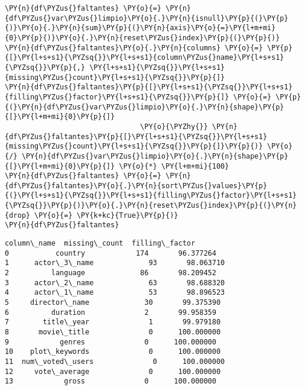     \begin{tcolorbox}[breakable, size=fbox, boxrule=1pt, pad at break*=1mm,colback=cellbackground, colframe=cellborder]
\begin{Verbatim}[commandchars=\\\{\}]
\PY{n}{df\PYZus{}faltantes} \PY{o}{=} \PY{n}{df\PYZus{}var\PYZus{}limpio}\PY{o}{.}\PY{n}{isnull}\PY{p}{(}\PY{p}{)}\PY{o}{.}\PY{n}{sum}\PY{p}{(}\PY{n}{axis}\PY{o}{=}\PY{l+m+mi}{0}\PY{p}{)}\PY{o}{.}\PY{n}{reset\PYZus{}index}\PY{p}{(}\PY{p}{)}
\PY{n}{df\PYZus{}faltantes}\PY{o}{.}\PY{n}{columns} \PY{o}{=} \PY{p}{[}\PY{l+s+s1}{\PYZsq{}}\PY{l+s+s1}{column\PYZus{}name}\PY{l+s+s1}{\PYZsq{}}\PY{p}{,} \PY{l+s+s1}{\PYZsq{}}\PY{l+s+s1}{missing\PYZus{}count}\PY{l+s+s1}{\PYZsq{}}\PY{p}{]}
\PY{n}{df\PYZus{}faltantes}\PY{p}{[}\PY{l+s+s1}{\PYZsq{}}\PY{l+s+s1}{filling\PYZus{}factor}\PY{l+s+s1}{\PYZsq{}}\PY{p}{]} \PY{o}{=} \PY{p}{(}\PY{n}{df\PYZus{}var\PYZus{}limpio}\PY{o}{.}\PY{n}{shape}\PY{p}{[}\PY{l+m+mi}{0}\PY{p}{]} 
                                \PY{o}{\PYZhy{}} \PY{n}{df\PYZus{}faltantes}\PY{p}{[}\PY{l+s+s1}{\PYZsq{}}\PY{l+s+s1}{missing\PYZus{}count}\PY{l+s+s1}{\PYZsq{}}\PY{p}{]}\PY{p}{)} \PY{o}{/} \PY{n}{df\PYZus{}var\PYZus{}limpio}\PY{o}{.}\PY{n}{shape}\PY{p}{[}\PY{l+m+mi}{0}\PY{p}{]} \PY{o}{*} \PY{l+m+mi}{100}
\PY{n}{df\PYZus{}faltantes} \PY{o}{=} \PY{n}{df\PYZus{}faltantes}\PY{o}{.}\PY{n}{sort\PYZus{}values}\PY{p}{(}\PY{l+s+s1}{\PYZsq{}}\PY{l+s+s1}{filling\PYZus{}factor}\PY{l+s+s1}{\PYZsq{}}\PY{p}{)}\PY{o}{.}\PY{n}{reset\PYZus{}index}\PY{p}{(}\PY{n}{drop} \PY{o}{=} \PY{k+kc}{True}\PY{p}{)}
\PY{n}{df\PYZus{}faltantes}
\end{Verbatim}
\end{tcolorbox}

            \begin{tcolorbox}[breakable, size=fbox, boxrule=.5pt, pad at break*=1mm, opacityfill=0]
\begin{Verbatim}[commandchars=\\\{\}]
        column\_name  missing\_count  filling\_factor
0           country            174       96.377264
1      actor\_3\_name             93       98.063710
2          language             86       98.209452
3      actor\_2\_name             63       98.688320
4      actor\_1\_name             53       98.896523
5     director\_name             30       99.375390
6          duration              2       99.958359
7        title\_year              1       99.979180
8       movie\_title              0      100.000000
9            genres              0      100.000000
10    plot\_keywords              0      100.000000
11  num\_voted\_users              0      100.000000
12     vote\_average              0      100.000000
13            gross              0      100.000000
\end{Verbatim}
\end{tcolorbox}
        

